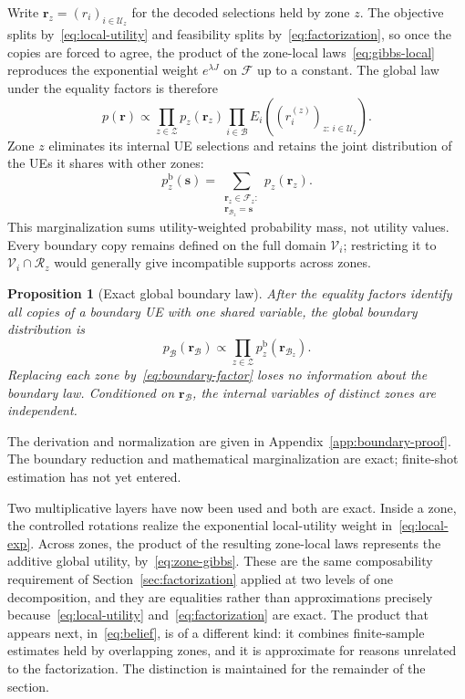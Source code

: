 \documentclass[journal]{IEEEtran}
\newtheorem{proposition}{Proposition}
\newcommand{\calF}{\mathcal{F}}  %
\newcommand{\calV}{\mathcal{V}}  %
\newcommand{\calU}{\mathcal{U}}  %
\newcommand{\calZ}{\mathcal{Z}}  %
\newcommand{\calB}{\mathcal{B}}  %
\newcommand{\calR}{\mathcal{R}}  %
\begin{document}
Write $\bm r_z=(r_i)_{i\in\calU_z}$ for the decoded selections held by zone $z$. The objective splits by~\eqref{eq:local-utility} and feasibility splits by~\eqref{eq:factorization}, so once the copies are forced to agree, the product of the zone-local laws~\eqref{eq:gibbs-local} reproduces the exponential weight $e^{\lambda J}$ on $\calF$ up to a constant. The global law under the equality factors is therefore
\begin{equation}
\label{eq:zone-gibbs}
p(\bm r)\propto
\prod_{z\in\calZ}p_z(\bm r_z)
\prod_{i\in\calB}
E_i\!\left((r_i^{(z)})_{z:\,i\in\calU_z}\right).
\end{equation}
Zone $z$ eliminates its internal UE selections and retains the joint distribution of the UEs it shares with other zones:
\begin{equation}
\label{eq:boundary-factor}
p_z^{\mathrm{b}}(\bm s)=
\sum_{\substack{\bm r_z\in\calF_z:\\\bm r_{\calB_z}=\bm s}}
p_z(\bm r_z).
\end{equation}
This marginalization sums utility-weighted probability mass, not utility values. Every boundary copy remains defined on the full domain $\calV_i$; restricting it to $\calV_i\cap\calR_z$ would generally give incompatible supports across zones.

\begin{proposition}[Exact global boundary law]
\label{prop:boundary}
After the equality factors identify all copies of a boundary UE with one shared variable, the global boundary distribution is
\begin{equation}
\label{eq:boundary-law}
p_{\calB}(\bm r_{\calB})\propto
\prod_{z\in\calZ}p_z^{\mathrm{b}}(\bm r_{\calB_z}).
\end{equation}
Replacing each zone by~\eqref{eq:boundary-factor} loses no information about the boundary law. Conditioned on $\bm r_{\calB}$, the internal variables of distinct zones are independent.
\end{proposition}
The derivation and normalization are given in Appendix~\ref{app:boundary-proof}. The boundary reduction and mathematical marginalization are exact; finite-shot estimation has not yet entered.

Two multiplicative layers have now been used and both are exact. Inside a zone, the controlled rotations realize the exponential local-utility weight in~\eqref{eq:local-exp}. Across zones, the product of the resulting zone-local laws represents the additive global utility, by~\eqref{eq:zone-gibbs}. These are the same composability requirement of Section~\ref{sec:factorization} applied at two levels of one decomposition, and they are equalities rather than approximations precisely because~\eqref{eq:local-utility} and~\eqref{eq:factorization} are exact. The product that appears next, in~\eqref{eq:belief}, is of a different kind: it combines finite-sample estimates held by overlapping zones, and it is approximate for reasons unrelated to the factorization. The distinction is maintained for the remainder of the section.
\end{document}
